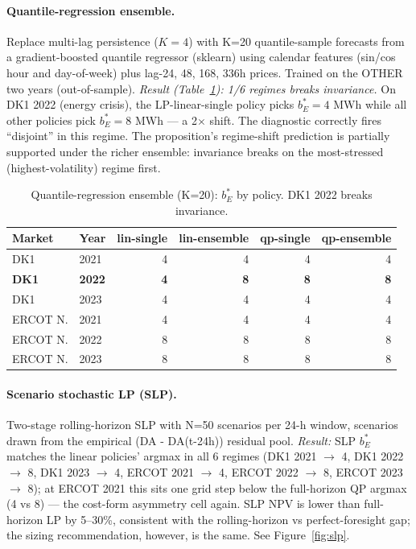 \documentclass[11pt]{article}
\begin{document}
\paragraph{Quantile-regression ensemble.} Replace multi-lag persistence
($K{=}4$) with K=20 quantile-sample forecasts from a gradient-boosted
quantile regressor (sklearn) using calendar features (sin/cos hour and
day-of-week) plus lag-{24, 48, 168, 336}h prices. Trained on the OTHER
two years (out-of-sample). \emph{Result (Table~\ref{tab:quantile}):
1/6 regimes breaks invariance.} On DK1 2022 (energy crisis), the
LP-linear-single policy picks $b_E^* = 4$ MWh while all other policies
pick $b_E^* = 8$ MWh --- a 2$\times$ shift. The diagnostic correctly
fires ``disjoint'' in this regime. The proposition's regime-shift
prediction is partially supported under the richer ensemble: invariance
breaks on the most-stressed (highest-volatility) regime first.

\begin{table}[t]
\centering\small
\caption{\label{tab:quantile}Quantile-regression ensemble (K=20): $b_E^*$ by policy.
DK1 2022 breaks invariance.}
\begin{tabular}{llrrrr}
\toprule
Market & Year & lin-single & lin-ensemble & qp-single & qp-ensemble \\
\midrule
DK1 & 2021 & 4 & 4 & 4 & 4 \\
\textbf{DK1} & \textbf{2022} & \textbf{4} & \textbf{8} & \textbf{8} & \textbf{8} \\
DK1 & 2023 & 4 & 4 & 4 & 4 \\
ERCOT N. & 2021 & 4 & 4 & 4 & 4 \\
ERCOT N. & 2022 & 8 & 8 & 8 & 8 \\
ERCOT N. & 2023 & 8 & 8 & 8 & 8 \\
\bottomrule
\end{tabular}
\end{table}

\paragraph{Scenario stochastic LP (SLP).} Two-stage rolling-horizon
SLP with N=50 scenarios per 24-h window, scenarios drawn from the
empirical (DA - DA(t-24h)) residual pool. \emph{Result:} SLP $b_E^*$
matches the linear policies' argmax in all 6 regimes (DK1 2021 $\to$
4, DK1 2022 $\to$ 8, DK1 2023 $\to$ 4, ERCOT 2021 $\to$ 4, ERCOT 2022
$\to$ 8, ERCOT 2023 $\to$ 8); at ERCOT 2021 this sits one grid step
below the full-horizon QP argmax (4 vs 8) --- the cost-form asymmetry
cell again. SLP NPV is lower than full-horizon LP
by 5--30\%, consistent with the rolling-horizon vs perfect-foresight
gap; the sizing recommendation, however, is the same. See
Figure~\ref{fig:slp}.
\end{document}
